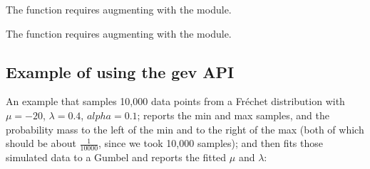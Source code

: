The  function requires augmenting with the
 module.

The  function requires augmenting with
the  module.

\subsection{Example of using the gev API}

An example that samples 10,000 data points from a Fr\'{e}chet
distribution with $\mu=-20$, $\lambda=0.4$, $alpha=0.1$; reports the
min and max samples, and the probability mass to the left of the min
and to the right of the max (both of which should be about
$\frac{1}{10000}$, since we took 10,000 samples); and then fits those
simulated data to a Gumbel and reports the fitted $\mu$ and $\lambda$:



